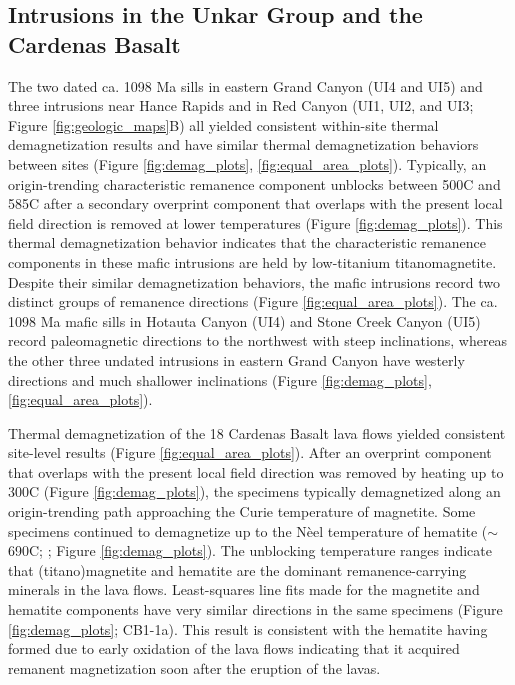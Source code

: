 \subsection*{Intrusions in the Unkar Group and the Cardenas Basalt}
The two dated ca. 1098 Ma sills in eastern Grand Canyon (UI4 and UI5) and three intrusions near Hance Rapids and in Red Canyon (UI1, UI2, and UI3; Figure \ref{fig:geologic_maps}B) all yielded consistent within-site thermal demagnetization results and have similar thermal demagnetization behaviors between sites (Figure \ref{fig:demag_plots}, \ref{fig:equal_area_plots}). Typically, an origin-trending characteristic remanence component unblocks between 500\textdegree C and 585\textdegree C after a secondary overprint component that overlaps with the present local field direction is removed at lower temperatures (Figure \ref{fig:demag_plots}). This thermal demagnetization behavior indicates that the characteristic remanence components in these mafic intrusions are held by low-titanium titanomagnetite. Despite their similar demagnetization behaviors, the mafic intrusions record two distinct groups of remanence directions (Figure \ref{fig:equal_area_plots}). The ca. 1098 Ma mafic sills in Hotauta Canyon (UI4) and Stone Creek Canyon (UI5) record paleomagnetic directions to the northwest with steep inclinations, whereas the other three undated intrusions in eastern Grand Canyon have westerly directions and much shallower inclinations (Figure \ref{fig:demag_plots}, \ref{fig:equal_area_plots}). 

Thermal demagnetization of the 18 Cardenas Basalt lava flows yielded consistent site-level results (Figure \ref{fig:equal_area_plots}). After an overprint component that overlaps with the present local field direction was removed by heating up to 300\textdegree C (Figure \ref{fig:demag_plots}), the specimens typically demagnetized along an origin-trending path approaching the Curie temperature of magnetite. Some specimens continued to demagnetize up to the N\`eel temperature of hematite ($\sim$690\textdegree C; ; Figure \ref{fig:demag_plots}). The unblocking temperature ranges indicate that (titano)magnetite and hematite are the dominant remanence-carrying minerals in the lava flows. Least-squares line fits made for the magnetite and hematite components have very similar directions in the same specimens (Figure \ref{fig:demag_plots}; CB1-1a). This result is consistent with the hematite having formed due to early oxidation of the lava flows indicating that it acquired remanent magnetization soon after the eruption of the lavas. 

